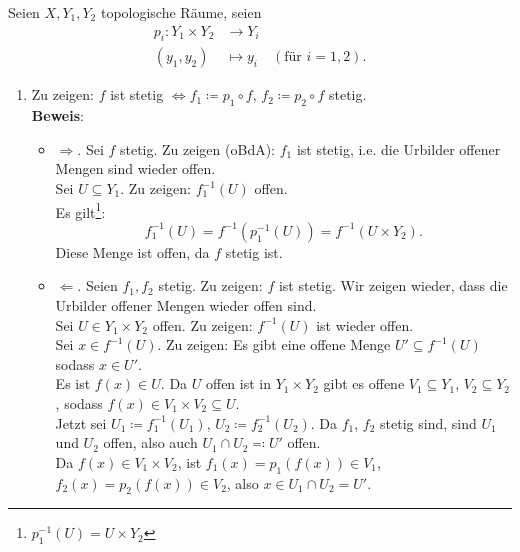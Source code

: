 \begin{problem*}[2]
  Seien $ X, Y_1, Y_2 $ topologische Räume, seien
  \begin{align*}
    p_i: Y_1 \times Y_2 &\to Y_i \\
    (y_1, y_2) &\mapsto y_i \quad (\text{für } i = 1,2)\text{.}
  \end{align*}
  \begin{enumerate}
    \item Zu zeigen: $ f $ ist stetig $ \Leftrightarrow f_1 \coloneqq p_1 \circ f $, $ f_2 \coloneqq p_2 \circ f $ stetig. \\
    \textbf{Beweis}:
    \begin{itemize}
       \item $ \Rightarrow $. Sei $ f $ stetig. Zu zeigen (oBdA): $ f_1 $ ist stetig, i.e. die Urbilder offener Mengen sind wieder offen. \\
        Sei $ U \subseteq Y_1 $. Zu zeigen: $ f_1^{-1}(U) $ offen. \\
        Es gilt\footnote{$ p_1^{-1}(U) = U \times Y_2 $}:
        \begin{equation*}
          f_1^{-1}(U) = f^{-1}(p_1^{-1}(U)) = f^{-1}(U \times Y_2)\text{.}
        \end{equation*}
        Diese Menge ist offen, da $ f $ stetig ist.
      \item $ \Leftarrow $. Seien $ f_1, f_2 $ stetig. Zu zeigen: $ f $ ist stetig. Wir zeigen wieder, dass die Urbilder offener Mengen wieder offen sind. \\
        Sei $ U \in Y_1 \times Y_2 $ offen. Zu zeigen: $ f^{-1}(U) $ ist wieder offen. \\
        Sei $ x \in f^{-1}(U) $. Zu zeigen: Es gibt eine offene Menge $ U' \subseteq f^{-1}(U) $ sodass $ x \in U' $. \\
        Es ist $ f(x) \in U $. Da $ U $ offen ist in $ Y_1 \times Y_2 $ gibt es offene $ V_1 \subseteq Y_1 $, $ V_2 \subseteq Y_2 $, sodass $ f( x ) \in V_1 \times V_2 \subseteq U $. \\
        Jetzt sei $ U_1 \coloneqq f_1^{-1}(U_1) $, $ U_2 \coloneqq f_2^{-1}(U_2) $. Da $ f_1 $, $ f_2 $ stetig sind, sind $ U_1 $ und $ U_2 $ offen, also auch $ U_1 \cap U_2 \eqqcolon U' $ offen. \\
        Da $ f( x ) \in V_1 \times V_2 $, ist $ f_1( x ) = p_1(f(x)) \in V_1 $, $ f_2(x) = p_2(f(x)) \in V_2 $, also $ x \in U_1 \cap U_2 = U' $.
     \end{itemize}


\end{enumerate}
\end{problem*}
